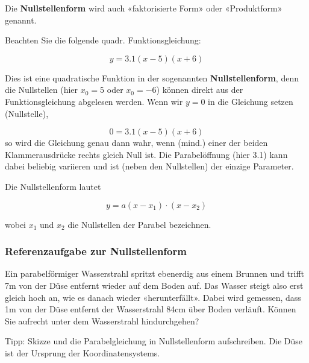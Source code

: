 Die \textbf{Nullstellenform} wird auch  «faktorisierte Form» oder
«Produktform» genannt.

Beachten Sie die folgende quadr. Funktionsgleichung:

$$y = 3.1(x-5)(x+6)$$

Dies ist eine quadratische Funktion in der sogenannten
\textbf{Nullstellenform}, denn die Nullstellen (hier $x_0 = 5$ oder
$x_0 = -6$) können direkt aus der Funktionsgleichung abgelesen werden.
Wenn wir $y=0$ in die Gleichung setzen (Nullstelle),

$$0 = 3.1(x-5)(x+6)$$
so wird die Gleichung genau dann wahr, wenn (mind.) einer der beiden Klammerausdrücke rechts
gleich Null ist. Die Parabelöffnung (hier 3.1) kann dabei beliebig variieren und ist (neben den Nullstellen) der einzige Parameter.

Die Nullstellenform lautet

\begin{gesetz}{}{}

  $$y = a(x-x_1)\cdot{}(x-x_2)$$

  \end{gesetz}

wobei $x_1$ und $x_2$ die Nullstellen der Parabel bezeichnen. 
\newpage


\subsubsection*{Referenzaufgabe zur Nullstellenform}


Ein parabelförmiger Wasserstrahl spritzt ebenerdig aus einem Brunnen und trifft 7m von der Düse entfernt wieder auf dem Boden auf.
Das Wasser steigt also erst gleich hoch an, wie es danach wieder «herunterfällt».
Dabei wird gemessen, dass 1m von der Düse entfernt der Wasserstrahl 84cm über Boden verläuft.
Können Sie aufrecht unter dem Wasserstrahl hindurchgehen?

Tipp: Skizze und  die Parabelgleichung in Nullstellenform aufschreiben. Die Düse ist der Ursprung der Koordinatensystems.\\



